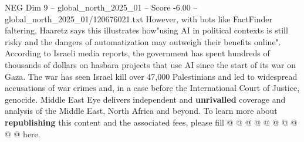 \begin{textsample}{NEG Dim 9 – global\_north\_2025\_01 – Score -6.00 – global\_north\_2025\_01/120676021.txt}
However, with bots like FactFinder faltering, Haaretz says this illustrates how"using AI in political contexts is still risky and the dangers of automatization may outweigh their benefits online".
According to Israeli media reports, the government has spent hundreds of thousands of dollars on hasbara projects that use AI since the start of its war on Gaza.
The war has seen Israel kill over 47,000 Palestinians and led to widespread accusations of war crimes and, in a case before the International Court of Justice, genocide.
Middle East Eye delivers independent and \textbf{unrivalled} coverage and analysis of the Middle East, North Africa and beyond.
To learn more about \textbf{republishing} this content and the associated fees, please fill @ @ @ @ @ @ @ @ @ @ here.

\end{textsample}

